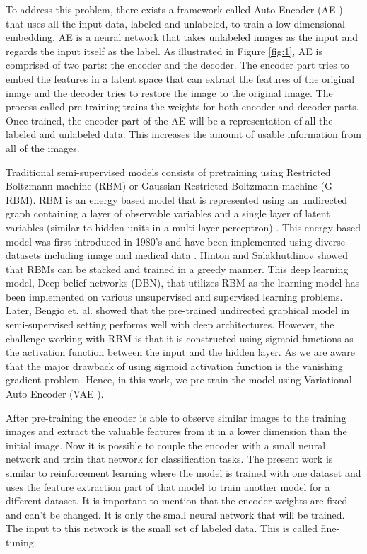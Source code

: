 \documentclass[sigconf, authorversion]{acmart}
\begin{document}
To address this problem, there exists a framework called Auto Encoder (AE \cite{wikiautoencode}) that uses all the input data, labeled and unlabeled, to train a low-dimensional embedding. AE is a neural network that takes unlabeled images as the input and regards the input itself as the label. As illustrated in Figure \ref{fig:1}, AE is comprised of two parts: the encoder and the decoder. The encoder part tries to embed the features in a latent space that can extract the features of the original image and the decoder tries to restore the image to the original image. The process called pre-training trains the weights for both encoder and decoder parts. Once trained, the encoder part of the AE will be a representation of all the labeled and unlabeled data. This increases the amount of usable information from all of the images.

Traditional semi-supervised models consists of pretraining using Restricted Boltzmann machine (RBM)\cite{Hinton} or Gaussian-Restricted Boltzmann machine (G-RBM)\cite{Hinton}. RBM is an energy based model that is represented using an undirected graph containing a layer of observable variables and a single layer of latent variables (similar to hidden units in a multi-layer perceptron) \cite{goodfellow2016deep,Murphy}. This energy based model was first introduced in 1980's \cite{Smolensky} and have been implemented using diverse datasets including image \cite{Hinton} and medical data \cite{Nguyen}.  Hinton and Salakhutdinov \cite{Salakhutdinov} showed that RBMs can be stacked and trained in a greedy manner. This deep learning model, Deep belief networks (DBN), that utilizes RBM as the learning model has been implemented on various unsupervised and supervised learning problems. Later, Bengio et. al. \cite{Bengio} showed that the pre-trained undirected graphical model in semi-supervised setting performs well with deep architectures. However, the challenge working with RBM is that it is constructed using sigmoid functions as the activation function between the input and the hidden layer. As we are aware that the major drawback of using sigmoid activation function is the vanishing gradient problem. Hence, in this work, we pre-train the model using Variational Auto Encoder (VAE \cite{wikiautoencode}).

After pre-training the encoder is able to observe similar images to the training images and extract the valuable features from it in a lower dimension than the initial image. Now it is possible to couple the encoder with a small neural network and train that network for classification tasks. The present work is similar to reinforcement learning where the model is trained with one dataset and uses the feature extraction part of that model to train another model for a different dataset. It is important to mention that the encoder weights are fixed and can't be changed. It is only the small neural network that will be trained. The input to this network is the small set of labeled data. This is called fine-tuning.
\end{document}
